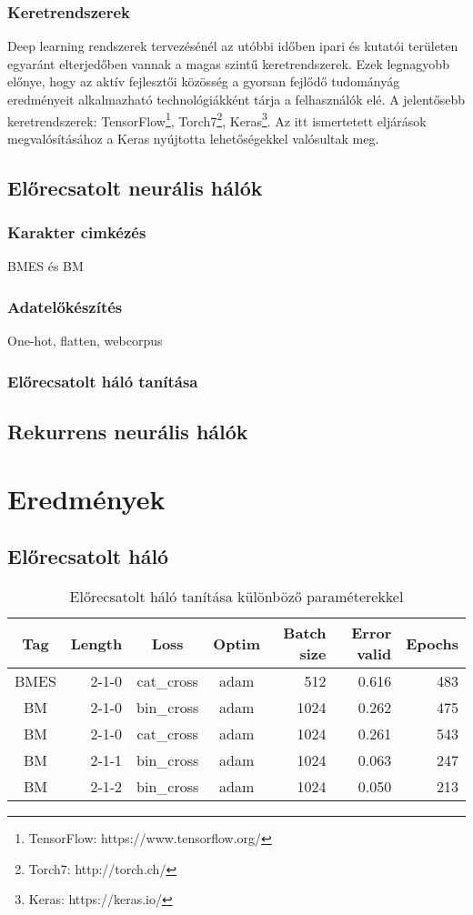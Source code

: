 \documentclass[a4paper, magyar]{article}
\begin{document}
\subsubsection{Keretrendszerek}
Deep learning rendszerek tervezésénél az utóbbi időben ipari és kutatói területen egyaránt elterjedőben vannak a magas szintű keretrendszerek. Ezek legnagyobb előnye, hogy az aktív fejlesztői közösség a gyorsan fejlődő tudományág eredményeit alkalmazható technológiákként tárja a felhasználók elé. A jelentősebb keretrendszerek: TensorFlow\footnote{TensorFlow: https://www.tensorflow.org/}, Torch7\footnote{Torch7: http://torch.ch/}, Keras\footnote{Keras: https://keras.io/}. Az itt ismertetett eljárások megvalósításához a Keras nyújtotta lehetőségekkel valósultak meg\cite{chollet2015keras}. 
\subsection{Előrecsatolt neurális hálók}
\subsubsection{Karakter cimkézés}
BMES és BM
\subsubsection{Adatelőkészítés}
One-hot, flatten, webcorpus
\subsubsection{Előrecsatolt háló tanítása}
\subsection{Rekurrens neurális hálók}
\section{Eredmények}
\subsection{Előrecsatolt háló}
\begin{table}[h]\centering
	\begin{tabular}{|c|r|c|c|r|r|r|}
		\hline
		Tag&Length&Loss&Optim&Batch size&Error valid&Epochs\\
		\hline
		BMES&2-1-0&cat\_cross&adam&512&0.616&483\\ 
		\hline
		BM&2-1-0&bin\_cross&adam&1024&0.262&475\\
		\hline
		BM&2-1-0&cat\_cross&adam&1024&0.261&543\\
		\hline
		BM&2-1-1&bin\_cross&adam&1024&0.063&247\\
		\hline
		BM&2-1-2&bin\_cross&adam&1024&0.050&213\\
		\hline
	\end{tabular}
	\caption{Előrecsatolt háló tanítása különböző paraméterekkel}
\end{table}


\end{document}
